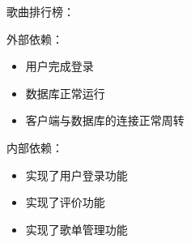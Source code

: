   
   歌曲排行榜：
  
   
  
    外部依赖：
    
    \begin{itemize}
    
    
    
        \item 用户完成登录
    
        \item 数据库正常运行
    
        \item 客户端与数据库的连接正常周转
    
    \end{itemize}
    
        
    
    内部依赖：    
    
        \begin{itemize}
    
        \item 实现了用户登录功能
    
        \item 实现了评价功能
    
        \item 实现了歌单管理功能 
    
    \end{itemize}
